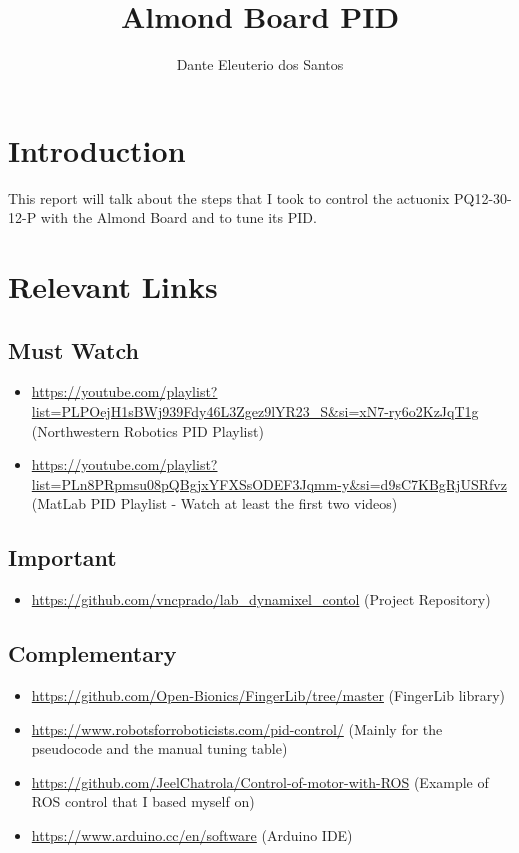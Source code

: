 \documentclass{article}
\title{Almond Board PID}
\author{Dante Eleuterio dos Santos }
\date{}
\begin{document}
\maketitle

\section{Introduction}
This report will talk about the steps that I took to control the actuonix PQ12-30-12-P with the Almond Board and to tune its PID.

\section{Relevant Links}

\subsection{Must Watch}
    \begin{itemize}
        \item \url{https://youtube.com/playlist?list=PLPOejH1sBWj939Fdy46L3Zgez9lYR23_S&si=xN7-ry6o2KzJqT1g} (Northwestern Robotics PID Playlist)
        \item \url{https://youtube.com/playlist?list=PLn8PRpmsu08pQBgjxYFXSsODEF3Jqmm-y&si=d9sC7KBgRjUSRfvz} (MatLab PID Playlist - Watch at least the first two videos)
    \end{itemize}

\subsection{Important}
    \begin{itemize}
        \item \url{https://github.com/vncprado/lab_dynamixel_contol} (Project Repository)
    \end{itemize}

\subsection{Complementary}
    \begin{itemize}
        \item \url{https://github.com/Open-Bionics/FingerLib/tree/master}   (FingerLib library)  
        \item \url{https://www.robotsforroboticists.com/pid-control/} (Mainly for the pseudocode and the manual tuning table)
        \item \url{https://github.com/JeelChatrola/Control-of-motor-with-ROS} (Example of ROS control that I based myself on)
        \item \url{https://www.arduino.cc/en/software} (Arduino IDE)
    \end{itemize}
\newpage
\end{document}

